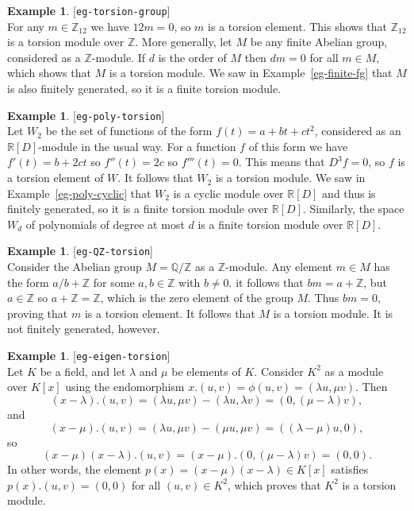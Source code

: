 \documentclass{amsart}
\newcommand{\lbl}[1]{\label{#1}\textup{[\texttt{#1}]}\ \\}
\newcommand{\lbl}{\label}
\newcommand{\Q}         {{\mathbb{Q}}}
\newcommand{\R}         {{\mathbb{R}}}
\newcommand{\Z}         {{\mathbb{Z}}}
\newcommand{\lm}        {\lambda}
\renewcommand{\:}{\colon}
\theoremstyle{definition}
\newtheorem{example}[theorem]{Example}
\begin{document}
\begin{example}\lbl{eg-torsion-group}
 For any $m\in \Z_{12}$ we have $12m=0$, so $m$ is a torsion element.
 This shows that $\Z_{12}$ is a torsion module over $\Z$.  More
 generally, let $M$ be any finite Abelian group, considered as a
 $\Z$-module.  If $d$ is the order of $M$ then $dm=0$ for all
 $m\in M$, which shows that $M$ is a torsion module.  We saw in
 Example~\ref{eg-finite-fg} that $M$ is also finitely generated, so it
 is a finite torsion module.
\end{example}
\begin{example}\lbl{eg-poly-torsion}
 Let $W_2$ be the set of functions of the form $f(t)=a+bt+ct^2$,
 considered as an $\R[D]$-module in the usual way.  For a function $f$
 of this form we have $f'(t)=b+2ct$ so $f''(t)=2c$ so $f'''(t)=0$.
 This means that $D^3f=0$, so $f$ is a torsion element of $W$.  It
 follows that $W_2$ is a torsion module.  We saw in
 Example~\ref{eg-poly-cyclic} that $W_2$ is a cyclic module over
 $\R[D]$ and thus is finitely generated, so it is a finite torsion
 module over $\R[D]$.  Similarly, the space $W_d$ of polynomials of
 degree at most $d$ is a finite torsion module over $\R[D]$.
\end{example}
\begin{example}\lbl{eg-QZ-torsion}
 Consider the Abelian group $M=\Q/\Z$ as a $\Z$-module.  Any element
 $m\in M$ has the form $a/b+\Z$ for some $a,b\in\Z$ with $b\neq 0$.
 it follows that $bm=a+\Z$, but $a\in\Z$ so $a+\Z=\Z$, which is the
 zero element of the group $M$.  Thus $bm=0$, proving that $m$ is a
 torsion element.  It follows that $M$ is a torsion module.  It is not
 finitely generated, however.
\end{example}
\begin{example}\lbl{eg-eigen-torsion}
 Let $K$ be a field, and let $\lm$ and $\mu$ be elements of $K$.
 Consider $K^2$ as a module over $K[x]$ using the endomorphism
 $x.(u,v)=\phi(u,v)=(\lm u,\mu v)$.  Then 
 \[ (x-\lm).(u,v)=(\lm u,\mu v)-(\lm u,\lm v)= (0,(\mu-\lm)v), \]
 and
 \[ (x-\mu).(u,v)=(\lm u,\mu v)-(\mu u,\mu v)= ((\lm-\mu)u,0), \]
 so 
 \[ (x-\mu)(x-\lm).(u,v) = (x-\mu).(0,(\mu-\lm)v) = (0,0). \]
 In other words, the element $p(x)=(x-\mu)(x-\lm)\in K[x]$ satisfies
 $p(x).(u,v)=(0,0)$ for all $(u,v)\in K^2$, which proves that $K^2$ is
 a torsion module.
\end{example}
\end{document}
